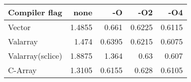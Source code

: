\begin{tabular}{lrrrr} \hline\hline
Compiler flag &    none &  -O &    -O2 &   -O4 \\ \hline
Vector &           1.4855 &0.661  &0.6225 &0.6115 \\
Valarray &         1.474  &0.6395 &0.6215 &0.6075 \\
Valarray(sclice) & 1.8875 &1.364  &0.63   &0.607 \\
C-Array &          1.3105 &0.6155 &0.628  &0.6105 \\ \hline\hline
\end{tabular}
